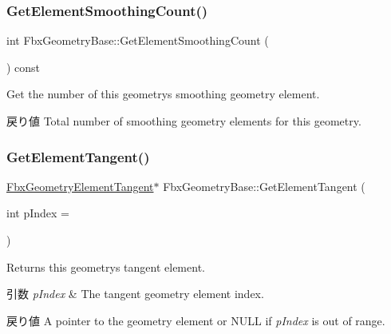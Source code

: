 \subsubsection{\texorpdfstring{Get\+Element\+Smoothing\+Count()}{GetElementSmoothingCount()}}
{\footnotesize\ttfamily int Fbx\+Geometry\+Base\+::\+Get\+Element\+Smoothing\+Count (\begin{DoxyParamCaption}{ }\end{DoxyParamCaption}) const}

Get the number of this geometry\textquotesingle{}s smoothing geometry element. \begin{DoxyReturn}{戻り値}
Total number of smoothing geometry elements for this geometry. 
\end{DoxyReturn}
\mbox{\label{class_fbx_geometry_base_a28cf260152f84ce031a3d2844b9895cc}} 
\subsubsection{\texorpdfstring{Get\+Element\+Tangent()}{GetElementTangent()}\hspace{0.1cm}{\footnotesize\ttfamily [1/2]}}
{\footnotesize\ttfamily \hyperlink{fbxlayer_8h_a291cacd8b247483cc24704c8f49087a7}{Fbx\+Geometry\+Element\+Tangent}$\ast$ Fbx\+Geometry\+Base\+::\+Get\+Element\+Tangent (\begin{DoxyParamCaption}\item[{int}]{p\+Index = {} }\end{DoxyParamCaption})}

Returns this geometry\textquotesingle{}s tangent element. 
\begin{DoxyParams}{引数}
{\em p\+Index} & The tangent geometry element index. \\
\hline
\end{DoxyParams}
\begin{DoxyReturn}{戻り値}
A pointer to the geometry element or {\ttfamily N\+U\+LL} if {\itshape p\+Index} is out of range. 
\end{DoxyReturn}
\mbox{\label{class_fbx_geometry_base_a5fedf8c0a50736da2fa590cf1b922506}} 
